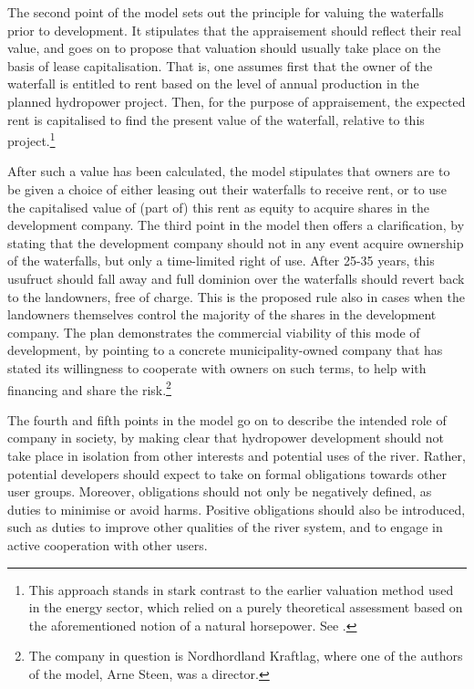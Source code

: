 The second point of the model sets out the principle for valuing the waterfalls prior to development. It stipulates that the appraisement should reflect their real value, and goes on to propose that valuation should usually take place on the basis of lease capitalisation. That is, one assumes first that the owner of the waterfall is entitled to rent based on the level of annual production in the planned hydropower project. Then, for the purpose of appraisement, the expected rent is capitalised to find the present value of the waterfall, relative to this project.\footnote{This approach stands in stark contrast to the earlier valuation method used in the energy sector, which relied on a purely theoretical assessment based on the aforementioned notion of a natural horsepower. See \cite{dyrkolbotn15,hellandsfoss97}.}

After such a value has been calculated, the model stipulates that owners are to be given a choice of either leasing out their waterfalls to receive rent, or to use the capitalised value of (part of) this rent as equity to acquire shares in the development company. The third point in the model then offers a clarification, by stating that the development company should not in any event acquire ownership of the waterfalls, but only a time-limited right of use. After 25-35 years, this usufruct should fall away and full dominion over the waterfalls should revert back to the landowners, free of charge. This is the proposed rule also in cases when the landowners themselves control the majority of the shares in the development company. The plan demonstrates the commercial viability of this mode of development, by pointing to a concrete municipality-owned company that has stated its willingness to cooperate with owners on such terms, to help with financing and share the risk.\footnote{The company in question is Nordhordland Kraftlag, where one of the authors of the model, Arne Steen, was a director.}

The fourth and fifth points in the model go on to describe the intended role of company in society, by making clear that hydropower development should not take place in isolation from other interests and potential uses of the river. Rather, potential developers should expect to take on formal obligations towards other user groups. Moreover, obligations should not only be negatively defined, as duties to minimise or avoid harms. Positive obligations should also be introduced, such as duties to improve other qualities of the river system, and to engage in active cooperation with other users.

